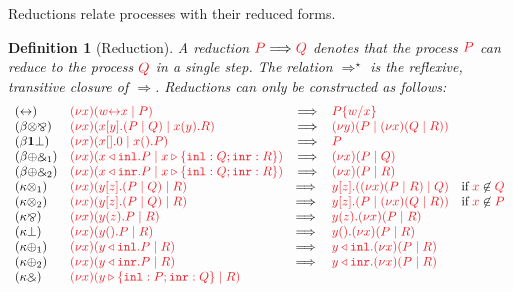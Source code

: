 \documentclass[draft,submission,copyright,creativecommons]{eptcs}
\newtheorem{definition}{Definition}
\begin{document}
Reductions relate processes with their reduced forms.
\begin{definition}[Reduction]\label{def:cp-reduction}
  A reduction $\reducesto{P}{Q}$ denotes that the process $\tm{P}$ can reduce
  to the process $\tm{Q}$ in a single step.
  The relation $\Longrightarrow^\star$ is the reflexive, transitive closure of
  $\Longrightarrow$.
  Reductions can only be constructed as follows:
 \[
    \begin{array}{llcll}
      \cpRedAxCut1
      & \tm{\cpCut{x}{\cpLink{w}{x}}{P}}
      & \Longrightarrow
      & \tm{\cpSub{w}{x}{P}} 
      \\
      \cpRedBetaTensParr
      & \tm{\cpCut{x}{\cpSend{x}{y}{P}{Q}}{\cpRecv{x}{y}{R}}}
      & \Longrightarrow
      & \tm{\cpCut{y}{P}{\cpCut{x}{Q}{R}}}
      \\
      \cpRedBetaOneBot
      & \tm{\cpCut{x}{\cpHalt{x}}{\cpWait{x}{P}}}
      & \Longrightarrow
      & \tm{P}
      \\
      \cpRedBetaPlusWith1
      & \tm{\cpCut{x}{\cpInl{x}{P}}{\cpCase{x}{Q}{R}}}
      & \Longrightarrow
      & \tm{\cpCut{x}{P}{Q}}
      \\
      \cpRedBetaPlusWith2
      & \tm{\cpCut{x}{\cpInr{x}{P}}{\cpCase{x}{Q}{R}}}
      & \Longrightarrow
      & \tm{\cpCut{x}{P}{R}}
      \\
      \cpRedKappaTens1
      & \tm{\cpCut{x}{\cpSend{y}{z}{P}{Q}}{R}}
      & \Longrightarrow \;
      & \tm{\cpSend{y}{z}{\cpCut{x}{P}{R}}{Q}}
        \quad \text{if} \; \notFreeIn{x}{Q}
      \\
      \cpRedKappaTens2
      & \tm{\cpCut{x}{\cpSend{y}{z}{P}{Q}}{R}}
      & \Longrightarrow \;
      & \tm{\cpSend{y}{z}{P}{\cpCut{x}{Q}{R}}}
        \quad \text{if} \; \notFreeIn{x}{P}
      \\
      \cpRedKappaParr
      & \tm{\cpCut{x}{\cpRecv{y}{z}{P}}{R}}
      & \Longrightarrow \;
      & \tm{\cpRecv{y}{z}{\cpCut{x}{P}{R}}}
      \\
      \cpRedKappaBot
      & \tm{\cpCut{x}{\cpWait{y}{P}}{R}}
      & \Longrightarrow \;
      & \tm{\cpWait{y}{\cpCut{x}{P}{R}}}
      \\
      \cpRedKappaPlus1
      & \tm{\cpCut{x}{\cpInl{y}{P}}{R}}
      & \Longrightarrow \;
      & \tm{\cpInl{y}{\cpCut{x}{P}{R}}}
      \\
      \cpRedKappaPlus2
      &\tm{\cpCut{x}{\cpInr{y}{P}}{R}}
      & \Longrightarrow \;
      & \tm{\cpInr{y}{\cpCut{x}{P}{R}}}
      \\
      \cpRedKappaWith
      & \tm{\cpCut{x}{\cpCase{y}{P}{Q}}{R}}

\end{array}\]
\end{definition}
\end{document}
